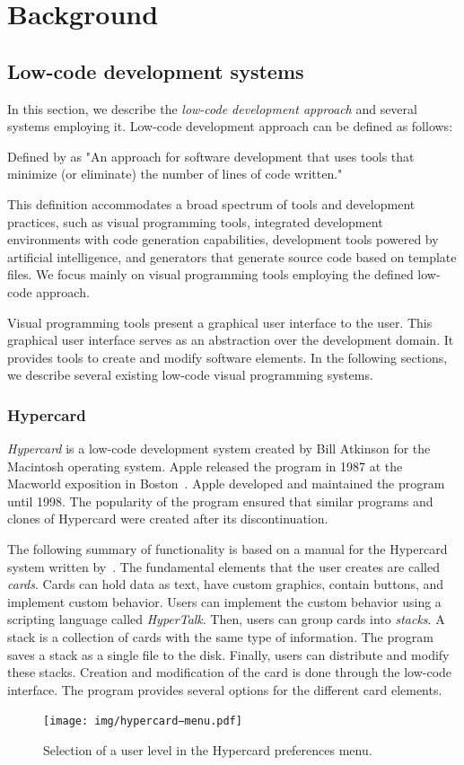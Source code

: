 \chapter{Background}
\label{chap:background}

\section{Low-code development systems}
\label{sec:low-code}
In this section, we describe the \emph{low-code development approach} and several systems employing it.
Low-code development approach can be defined as follows:
\begin{defn}
	Defined by \citet{Pinho_Aguiar_Amaral_2023} as "An approach for software development that uses tools that minimize (or eliminate) the number of lines of code written."
\end{defn}
This definition accommodates a broad spectrum of tools and development practices, such as visual programming tools,
integrated development environments with code generation capabilities, development tools powered by artificial intelligence, and generators that generate source code based on template files.
We focus mainly on visual programming tools employing the defined low-code approach.

Visual programming tools present a graphical user interface to the user. This graphical user interface serves as an abstraction over
the development domain. It provides tools to create and modify software elements.
In the following sections, we describe several existing low-code visual programming systems.

\subsection{Hypercard}
\emph{Hypercard} is a low-code development system created by Bill Atkinson for the Macintosh operating system. Apple released the program in 1987 at the
Macworld exposition in Boston~\cite{hyper_release}. Apple developed and maintained the program until 1998.
The popularity of the program ensured that similar programs and clones of Hypercard were created after its discontinuation.

The following summary of functionality is based on a manual for the Hypercard system written by~\citet{goodman_hypertext}.
The fundamental elements that the user creates are called \emph{cards}. Cards can hold data as text, have custom graphics, contain buttons, and implement custom behavior.
Users can implement the custom behavior using a scripting language called \emph{HyperTalk}. Then, users can group cards into \emph{stacks}. A stack is a collection of cards with the same type of information.
The program saves a stack as a single file to the disk. Finally, users can distribute and modify these stacks.
Creation and modification of the card is done through the low-code interface. The program provides several options for the different card elements.
\begin{figure}
	\centering
	\texttt{[image: img/hypercard−menu.pdf]}
	\caption{Selection of a user level in the Hypercard preferences menu.}
	\label{fig:f}
\end{figure}

